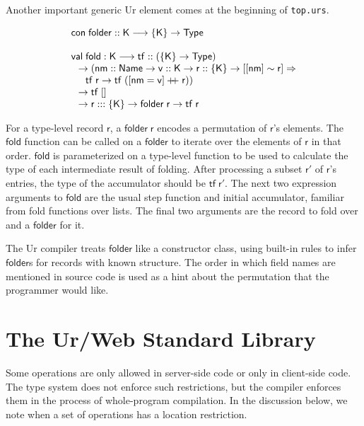 \documentclass{article}
\newcommand{\mt}[1]{\mathsf{#1}}
\newcommand{\rc}{+ \hspace{-.075in} + \;}
\begin{document}
Another important generic Ur element comes at the beginning of \texttt{top.urs}.

$$\begin{array}{l}
  \mt{con} \; \mt{folder} :: \mt{K} \longrightarrow \{\mt{K}\} \to \mt{Type} \\
  \\
  \mt{val} \; \mt{fold} : \mt{K} \longrightarrow \mt{tf} :: (\{\mt{K}\} \to \mt{Type}) \\
  \hspace{.1in} \to (\mt{nm} :: \mt{Name} \to \mt{v} :: \mt{K} \to \mt{r} :: \{\mt{K}\} \to [[\mt{nm}] \sim \mt{r}] \Rightarrow \\
  \hspace{.2in} \mt{tf} \; \mt{r} \to \mt{tf} \; ([\mt{nm} = \mt{v}] \rc \mt{r})) \\
  \hspace{.1in} \to \mt{tf} \; [] \\
  \hspace{.1in} \to \mt{r} ::: \{\mt{K}\} \to \mt{folder} \; \mt{r} \to \mt{tf} \; \mt{r}
\end{array}$$

For a type-level record $\mt{r}$, a $\mt{folder} \; \mt{r}$ encodes a permutation of $\mt{r}$'s elements.  The $\mt{fold}$ function can be called on a $\mt{folder}$ to iterate over the elements of $\mt{r}$ in that order.  $\mt{fold}$ is parameterized on a type-level function to be used to calculate the type of each intermediate result of folding.  After processing a subset $\mt{r'}$ of $\mt{r}$'s entries, the type of the accumulator should be $\mt{tf} \; \mt{r'}$.  The next two expression arguments to $\mt{fold}$ are the usual step function and initial accumulator, familiar from fold functions over lists.  The final two arguments are the record to fold over and a $\mt{folder}$ for it.

The Ur compiler treats $\mt{folder}$ like a constructor class, using built-in rules to infer $\mt{folder}$s for records with known structure.  The order in which field names are mentioned in source code is used as a hint about the permutation that the programmer would like.


\section{The Ur/Web Standard Library}

Some operations are only allowed in server-side code or only in client-side code.  The type system does not enforce such restrictions, but the compiler enforces them in the process of whole-program compilation.  In the discussion below, we note when a set of operations has a location restriction.
\end{document}
